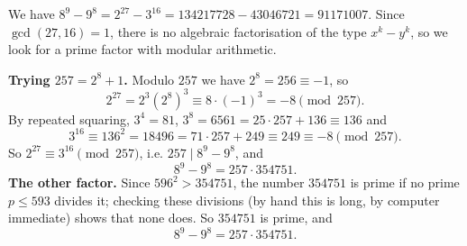 We have $8^9-9^8=2^{27}-3^{16}=134217728-43046721=91171007$. Since $\gcd(27,16)=1$, there is no algebraic factorisation of the type $x^k-y^k$, so we look for a prime factor with modular arithmetic.

\textbf{Trying $257=2^8+1$.} Modulo $257$ we have $2^8=256\equiv-1$, so
\[2^{27}=2^3\left(2^8\right)^3\equiv8\cdot(-1)^3=-8\pmod{257}.\]
By repeated squaring, $3^4=81$, $3^8=6561=25\cdot257+136\equiv136$ and
\[3^{16}\equiv136^2=18496=71\cdot257+249\equiv249\equiv-8\pmod{257}.\]
So $2^{27}\equiv3^{16}\pmod{257}$, i.e. $257\mid8^9-9^8$, and
\[8^9-9^8=257\cdot354751.\]
\textbf{The other factor.} Since $596^2>354751$, the number $354751$ is prime if no prime $p\le593$ divides it; checking these divisions (by hand this is long, by computer immediate) shows that none does. So $354751$ is prime, and
\[8^9-9^8=\boxed{257\cdot354751}.\]
